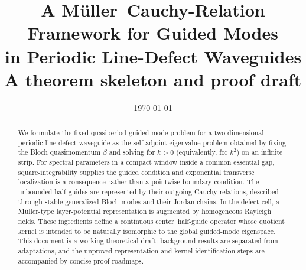 \documentclass[11pt]{article}
\title{A M\"uller--Cauchy-Relation Framework for Guided Modes\\
in Periodic Line-Defect Waveguides\\[0.5em]
\large A theorem skeleton and proof draft}
\author{}
\date{\today}
\theoremstyle{definition}
\theoremstyle{remark}
\begin{document}
\maketitle

\begin{abstract}
We formulate the fixed-quasiperiod guided-mode problem for a two-dimensional
periodic line-defect waveguide as the self-adjoint eigenvalue problem obtained
by fixing the Bloch quasimomentum $\beta$ and solving for $k>0$ (equivalently,
for $k^2$) on an infinite strip.  For spectral parameters in a compact window
inside a common essential gap, square-integrability supplies the guided condition and
exponential transverse localization is a consequence rather than a pointwise
boundary condition.  The unbounded half-guides are represented by their outgoing
Cauchy relations, described through stable generalized Bloch modes and their
Jordan chains.  In the defect cell, a M\"uller-type layer-potential
representation is augmented by homogeneous Rayleigh fields.  These ingredients
define a continuous center--half-guide operator whose quotient kernel is intended to
be naturally isomorphic to the global guided-mode eigenspace.  This document is
a working theoretical draft: background results are separated from adaptations,
and the unproved representation and kernel-identification steps are accompanied
by concise proof roadmaps.
\end{abstract}






\appendix




\printbibliography
\end{document}
